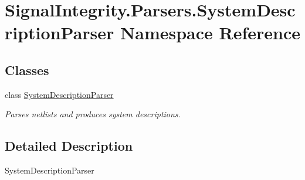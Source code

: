 \hypertarget{namespaceSignalIntegrity_1_1Parsers_1_1SystemDescriptionParser}{}\section{Signal\+Integrity.\+Parsers.\+System\+Description\+Parser Namespace Reference}
\label{namespaceSignalIntegrity_1_1Parsers_1_1SystemDescriptionParser}
\subsection*{Classes}
\begin{DoxyCompactItemize}
\item 
class \hyperlink{classSignalIntegrity_1_1Parsers_1_1SystemDescriptionParser_1_1SystemDescriptionParser}{System\+Description\+Parser}
\begin{DoxyCompactList}\small\item\em Parses netlists and produces system descriptions. \end{DoxyCompactList}\end{DoxyCompactItemize}


\subsection{Detailed Description}
\begin{DoxyVerb}SystemDescriptionParser\end{DoxyVerb}
 